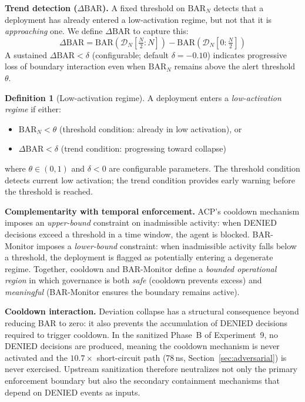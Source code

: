 \documentclass[11pt]{article}
\theoremstyle{definition}
\newtheorem{definition}{Definition}
\begin{document}
\textbf{Trend detection ($\Delta\mathrm{BAR}$).}
A fixed threshold on $\mathrm{BAR}_N$ detects that a deployment has already
entered a low-activation regime, but not that it is \emph{approaching} one.
We define $\Delta\mathrm{BAR}$ to capture this:
\[
  \Delta\mathrm{BAR}
    = \mathrm{BAR}\!\left(\mathcal{D}_N\!\left[\tfrac{N}{2}{:}N\right]\right)
    - \mathrm{BAR}\!\left(\mathcal{D}_N\!\left[0{:}\tfrac{N}{2}\right]\right)
\]
A sustained $\Delta\mathrm{BAR} < \delta$ (configurable; default $\delta = -0.10$)
indicates progressive loss of boundary interaction even when $\mathrm{BAR}_N$
remains above the alert threshold $\theta$.

\begin{definition}[Low-activation regime]
A deployment enters a \emph{low-activation regime} if either:
\begin{itemize}[noitemsep]
  \item $\mathrm{BAR}_N < \theta$ \hfill(threshold condition: already in low activation), or
  \item $\Delta\mathrm{BAR} < \delta$ \hfill(trend condition: progressing toward collapse)
\end{itemize}
where $\theta \in (0,1)$ and $\delta < 0$ are configurable parameters.
The threshold condition detects current low activation; the trend condition
provides early warning before the threshold is reached.
\end{definition}

\textbf{Complementarity with temporal enforcement.}
ACP's cooldown mechanism imposes an \emph{upper-bound} constraint on inadmissible
activity: when DENIED decisions exceed a threshold in a time window, the agent
is blocked.
BAR-Monitor imposes a \emph{lower-bound} constraint: when inadmissible activity
falls below a threshold, the deployment is flagged as potentially entering a
degenerate regime.
Together, cooldown and BAR-Monitor define a \emph{bounded operational region}
in which governance is both \emph{safe} (cooldown prevents excess) and
\emph{meaningful} (BAR-Monitor ensures the boundary remains active).

\textbf{Cooldown interaction.}
Deviation collapse has a structural consequence beyond reducing BAR to zero:
it also prevents the accumulation of DENIED decisions required to trigger
cooldown.
In the sanitized Phase~B of Experiment~9, no DENIED decisions are produced,
meaning the cooldown mechanism is never activated and the $10.7\times$ short-circuit
path (78\,ns, Section~\ref{sec:adversarial}) is never exercised.
Upstream sanitization therefore neutralizes not only the primary enforcement
boundary but also the secondary containment mechanisms that depend on DENIED
events as inputs.
\end{document}
